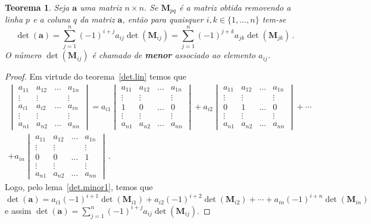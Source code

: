 \documentclass[12pt,a4paper]{report}
\newcommand{\mb}{\mathbf}
\newtheorem{thm}{Teorema}[chapter]
\begin{document}
\begin{thm}
  \label{det.minor}
  Seja $\mb a$ uma matriz $n\times n$. Se $\mb M_{pq}$ é a matriz obtida removendo a linha $p$ e a coluna $q$ da matriz $\mb a$, então para quaisquer $i,k\in\{1,\ldots,n\}$ tem-se
  $$\det(\mb a)=\sum_{j=1}^n(-1)^{i+j}a_{ij}\det(\mb M_{ij})=\sum_{j=1}^n(-1)^{j+k}a_{jk}\det(\mb M_{jk})\,.$$
  O número $\det(\mb M_{ij})$ é chamado de \textbf{menor} associado ao elemento $a_{ij}$.
\end{thm}
\begin{proof}
  Em virtude do teorema~\ref{det.lin} temos que
  \begin{multline*}
    \begin{vmatrix}
      a_{11}&a_{12}&\ldots&a_{1n}\\
      \vdots&\vdots&&\vdots\\
      a_{i1}&a_{i2}&\ldots&a_{in}\\
      \vdots&\vdots&&\vdots\\
      a_{n1}&a_{n2}&\ldots&a_{nn}
    \end{vmatrix}=a_{i1}\begin{vmatrix}
      a_{11}&a_{12}&\ldots&a_{1n}\\
      \vdots&\vdots&&\vdots\\
      1&0&\ldots&0\\
      \vdots&\vdots&&\vdots\\
      a_{n1}&a_{n2}&\ldots&a_{nn}
    \end{vmatrix}+a_{i2}\begin{vmatrix}
      a_{11}&a_{12}&\ldots&a_{1n}\\
      \vdots&\vdots&&\vdots\\
      0&1&\ldots&0\\
      \vdots&\vdots&&\vdots\\
      a_{n1}&a_{n2}&\ldots&a_{nn}
    \end{vmatrix}+\cdots\\
    +a_{in}\begin{vmatrix}
      a_{11}&a_{12}&\ldots&a_{1n}\\
      \vdots&\vdots&&\vdots\\
      0&0&\ldots&1\\
      \vdots&\vdots&&\vdots\\
      a_{n1}&a_{n2}&\ldots&a_{nn}
    \end{vmatrix}\,.
  \end{multline*}
  Logo, pelo lema~\ref{det.minor1}, temos que
  $$\det(\mb a)=a_{i1}(-1)^{i+1}\det(\mb M_{i1})+a_{i2}(-1)^{i+2}\det(\mb M_{i2})+\cdots+a_{in}(-1)^{i+n}\det(\mb M_{in})$$
  e assim $\det(\mb a)=\sum_{j=1}^n(-1)^{i+j}a_{ij}\det(\mb M_{ij})$.
\end{proof}
\end{document}
